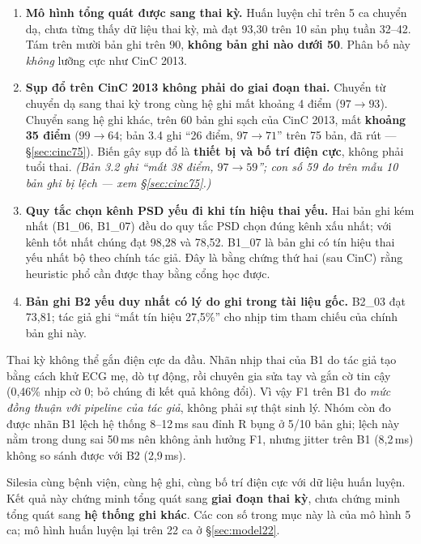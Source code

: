 \begin{enumerate}[leftmargin=1.6em,itemsep=4pt]
\item \textbf{Mô hình tổng quát được sang thai kỳ.} Huấn luyện chỉ trên 5 ca chuyển dạ, chưa từng thấy dữ
liệu thai kỳ, mà đạt 93,30 trên 10 sản phụ tuần 32--42. Tám trên mười bản ghi trên 90, \textbf{không bản
ghi nào dưới 50}. Phân bố này \textit{không} lưỡng cực như CinC 2013.
\item \textbf{Sụp đổ trên CinC 2013 không phải do giai đoạn thai.} Chuyển từ chuyển dạ sang thai kỳ trong
cùng hệ ghi mất khoảng 4 điểm ($97 \to 93$). Chuyển sang hệ ghi khác, trên 60 bản ghi sạch của CinC 2013,
mất \textbf{khoảng 35 điểm} ($99 \to 64$; bản 3.4 ghi ``26 điểm, $97 \to 71$'' trên 75 bản, đã rút ---
\S\ref{sec:cinc75}). Biến gây sụp đổ là \textbf{thiết bị và bố trí điện cực}, không phải tuổi
thai. \textit{(Bản 3.2 ghi ``mất 38 điểm, $97 \to 59$''; con số 59 đo trên mẫu 10 bản ghi bị lệch ---
xem \S\ref{sec:cinc75}.)}
\item \textbf{Quy tắc chọn kênh PSD yếu đi khi tín hiệu thai yếu.} Hai bản ghi kém nhất (B1\_06, B1\_07) đều
do quy tắc PSD chọn đúng kênh xấu nhất; với kênh tốt nhất chúng đạt 98,28 và 78,52. B1\_07 là bản ghi có
tín hiệu thai yếu nhất bộ theo chính tác giả. Đây là bằng chứng thứ hai (sau CinC) rằng heuristic phổ
cần được thay bằng cổng học được.
\item \textbf{Bản ghi B2 yếu duy nhất có lý do ghi trong tài liệu gốc.} B2\_03 đạt 73,81; tác giả ghi
``mất tín hiệu 27,5\%'' cho nhịp tim tham chiếu của chính bản ghi này.
\end{enumerate}

\begin{canhbao}[title={Nhãn B1 không phải chuẩn vàng --- phải nói rõ khi công bố}]
Thai kỳ không thể gắn điện cực da đầu. Nhãn nhịp thai của B1 do tác giả tạo bằng cách khử ECG mẹ, dò tự
động, rồi chuyên gia sửa tay và gắn cờ tin cậy (0,46\% nhịp cờ 0; bỏ chúng đi kết quả không đổi). Vì
vậy F1 trên B1 đo \textit{mức đồng thuận với pipeline của tác giả}, không phải sự thật sinh lý. Nhóm còn
đo được nhãn B1 lệch hệ thống 8--12\,ms sau đỉnh R bụng ở 5/10 bản ghi; lệch này nằm trong dung sai 50\,ms
nên không ảnh hưởng F1, nhưng jitter trên B1 (8,2\,ms) không so sánh được với B2 (2,9\,ms).

Silesia cùng bệnh viện, cùng hệ ghi, cùng bố trí điện cực với dữ liệu huấn luyện. Kết quả này chứng minh
tổng quát sang \textbf{giai đoạn thai kỳ}, chưa chứng minh tổng quát sang \textbf{hệ thống ghi khác}.
Các con số trong mục này là của mô hình 5 ca; mô hình huấn luyện lại trên 22 ca ở \S\ref{sec:model22}.
\end{canhbao}
